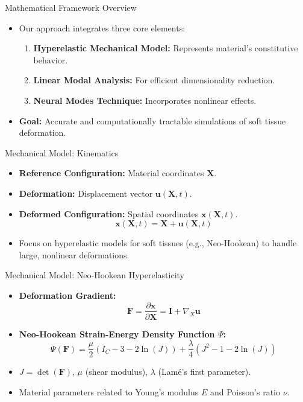 \documentclass{beamer}
\begin{document}
\begin{frame}{Mathematical Framework Overview}
    \begin{itemize}
        \item Our approach integrates three core elements:
        \begin{enumerate}
            \item \textbf{Hyperelastic Mechanical Model:} Represents material's constitutive behavior.
            \item \textbf{Linear Modal Analysis:} For efficient dimensionality reduction.
            \item \textbf{Neural Modes Technique:} Incorporates nonlinear effects.
        \end{enumerate}
        \item \textbf{Goal:} Accurate and computationally tractable simulations of soft tissue deformation.
    \end{itemize}
\end{frame}

\begin{frame}{Mechanical Model: Kinematics}
    \begin{itemize}
        \item \textbf{Reference Configuration:} Material coordinates \(\bm{X}\).
        \item \textbf{Deformation:} Displacement vector \(\bm{u}(\bm{X},t)\).
        \item \textbf{Deformed Configuration:} Spatial coordinates \(\bm{x}(\bm{X},t)\).
        \begin{equation*}
            \bm{x}(\bm{X},t) = \bm{X} + \bm{u}(\bm{X},t)
        \end{equation*}
        \item Focus on hyperelastic models for soft tissues (e.g., Neo-Hookean) to handle large, nonlinear deformations.
    \end{itemize}
\end{frame}

\begin{frame}{Mechanical Model: Neo-Hookean Hyperelasticity}
    \begin{itemize}
        \item \textbf{Deformation Gradient:}
        \begin{equation*}
            \bm{F} = \frac{\partial \bm{x}}{\partial \bm{X}} = \bm{I} + \nabla_X \bm{u}
        \end{equation*}
        \item \textbf{Neo-Hookean Strain-Energy Density Function \(\Psi\):}
        \begin{equation*}
            \Psi(\bm{F}) = \frac{\mu}{2} (I_C - 3 - 2\ln(J)) + \frac{\lambda}{4} (J^2 - 1 - 2\ln(J))
        \end{equation*}
        \item \(J = \det(\bm{F})\), \(\mu\) (shear modulus), \(\lambda\) (Lamé's first parameter).
        \item Material parameters related to Young's modulus \(E\) and Poisson's ratio \(\nu\).
    \end{itemize}
\end{frame}
\end{document}
